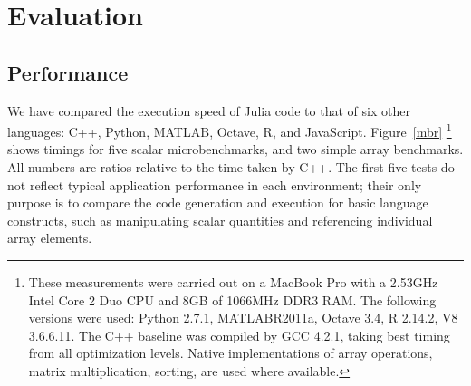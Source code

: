 \documentclass[9pt]{sigplanconf}
\begin{document}



\section{Evaluation}

\subsection{Performance}

We have compared the execution speed of Julia code to that of six other
languages: C++, Python, MATLAB\textregistered, Octave, R, and JavaScript.
Figure~\ref{mbr}
\footnote{
  These measurements were carried out on a MacBook Pro with a 2.53GHz
  Intel Core 2 Duo CPU and 8GB of 1066MHz DDR3 RAM. The following
  versions were used: Python 2.7.1, MATLAB\textregistered R2011a,
  Octave 3.4, R 2.14.2, V8 3.6.6.11.  The C++ baseline was compiled by
  GCC 4.2.1, taking best timing from all optimization levels. 
  Native implementations of array operations, matrix
  multiplication, sorting, are used where available.
}
shows timings for five scalar microbenchmarks, and two
simple array benchmarks. All numbers are ratios relative to
the time taken by C++. The first five tests do not
reflect typical application performance in each environment; their only
purpose is to compare the code generation and execution for basic language
constructs, such as manipulating scalar quantities and referencing individual
array elements.
\end{document}
